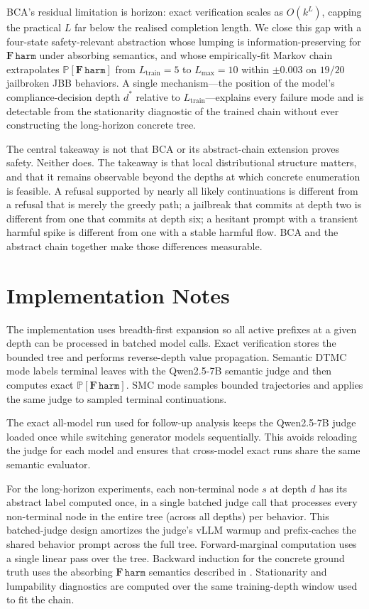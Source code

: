 \documentclass[11pt]{article}
\newcommand{\Prob}{\mathbb{P}}
\newcommand{\harm}{\texttt{harm}}
\newcommand{\BCA}{\textsc{BCA}}
\newcommand{\DTMC}{\textsc{DTMC}}
\begin{document}
\BCA's residual limitation is horizon: exact verification scales as $O(k^L)$, capping the practical $L$ far below the realised completion length.  We close this gap with a four-state safety-relevant abstraction whose lumping is information-preserving for $\mathbf{F}\,\harm$ under absorbing semantics, and whose empirically-fit Markov chain extrapolates $\Prob[\mathbf{F}\,\harm]$ from $L_\mathrm{train}=5$ to $L_\mathrm{max}=10$ within $\pm 0.003$ on $19/20$ jailbroken JBB behaviors.  A single mechanism---the position of the model's compliance-decision depth $d^*$ relative to $L_\mathrm{train}$---explains every failure mode and is detectable from the stationarity diagnostic of the trained chain without ever constructing the long-horizon concrete tree.

The central takeaway is not that \BCA{} or its abstract-chain extension proves safety.  Neither does.  The takeaway is that local distributional structure matters, and that it remains observable beyond the depths at which concrete enumeration is feasible.  A refusal supported by nearly all likely continuations is different from a refusal that is merely the greedy path; a jailbreak that commits at depth two is different from one that commits at depth six; a hesitant prompt with a transient harmful spike is different from one with a stable harmful flow.  \BCA{} and the abstract chain together make those differences measurable.

\appendix

\section{Implementation Notes}
\label{app:implementation}

The implementation uses breadth-first expansion so all active prefixes at a given depth can be processed in batched model calls.  Exact verification stores the bounded tree and performs reverse-depth value propagation.  Semantic \DTMC{} mode labels terminal leaves with the Qwen2.5-7B semantic judge and then computes exact $\Prob[\mathbf{F}\,\harm]$.  SMC mode samples bounded trajectories and applies the same judge to sampled terminal continuations.

The exact all-model run used for follow-up analysis keeps the Qwen2.5-7B judge loaded once while switching generator models sequentially.  This avoids reloading the judge for each model and ensures that cross-model exact runs share the same semantic evaluator.

For the long-horizon experiments, each non-terminal node $s$ at depth $d$ has its abstract label computed once, in a single batched judge call that processes every non-terminal node in the entire tree (across all depths) per behavior.  This batched-judge design amortizes the judge's vLLM warmup and prefix-caches the shared behavior prompt across the full tree.  Forward-marginal computation uses a single linear pass over the tree.  Backward induction for the concrete ground truth uses the absorbing $\mathbf{F}\,\harm$ semantics described in .  Stationarity and lumpability diagnostics are computed over the same training-depth window used to fit the chain.
\end{document}
